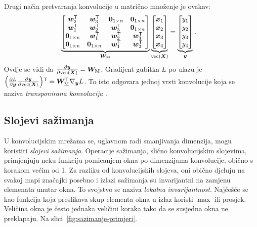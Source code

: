 \documentclass[utf8, diplomski, lmodern]{fer}
\begin{document}
Drugi način pretvaranja konvolucije u matrično množenje je ovakav: 
\begin{align}
\underbrace{
\begin{bmatrix}
\vec w_2^\tp & \vec w_3^\tp & \cvec 0_{1\times n} & \cvec 0_{1\times n} \\
\vec w_1^\tp & \vec w_2^\tp & \vec w_3^\tp & \cvec 0_{1\times n} \\
\cvec 0_{1\times n} & \vec w_1^\tp & \vec w_2^\tp & \vec w_3^\tp \\
\cvec 0_{1\times n} & \cvec 0_{1\times n} & \vec w_1^\tp & \vec w_2^\tp 
\end{bmatrix}
}_{\vec W_\text{M}}
\underbrace{
	\begin{bmatrix}
	\vec x_1 \\ \vec x_2 \\ \vec x_3 \\ \vec x_4 
	\end{bmatrix}
}_{\vecfunc(\vec X)}
= 
\underbrace{
	\begin{bmatrix}
	y_1 \\ y_2 \\ y_3 \\y_4     
	\end{bmatrix}
}_{\vec y}
\text{.}
\end{align}
Ovdje se vidi da $\pd{\vec y}{\vecfunc(\vec X)}=\vec W_\text{M}$. Gradijent gubitka $L$ po ulazu je $\del{\pd{L}{\vec y}\pd{\vec y}{\vecfunc(\vec X)}}^\tp = \vec W_\text{M}^\tp\nabla_{\vec y}L$. To isto odgovara jednoj vrsti konvolucije koja se naziva \emph{transponirana konvolucija} \citep{Segvic:2018:DUUUKS}.

\subsection{Slojevi sažimanja}

U konvolucijskim mrežama se, uglavnom radi smanjivanja dimenzija, mogu koristiti \emph{slojevi sažimanja}. Operacije sažimanja, slično konvolucijskim slojevima, primjenjuju neku funkciju pomicanjem okna po dimenzijama konvolucije, obično s korakom većim od 1. Za razliku od konvolucijskih slojeva, oni obično djeluju na svakoj mapi značajki posebno i izlazi sažimanja su invarijantni na zamjenu elemenata unutar okna. To svojstvo se naziva \emph{lokalna invarijantnost}. Najčešće se kao funkcija koja preslikava skup elementa okna u izlaz koristi $\max$ ili prosjek. Veličina okna je često jednaka veličini koraka tako da se susjedna okna ne preklapaju. Na slici~\ref{fig:sazimanje-primjeri}.
\end{document}
